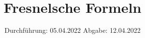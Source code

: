 

\subject{V407}
\title{Fresnelsche Formeln}
\date{%
  Durchführung: 05.04.2022
  \hspace{3em}
  Abgabe: 12.04.2022
}



\maketitle
\thispagestyle{empty}
\tableofcontents
\newpage







\printbibliography{}


